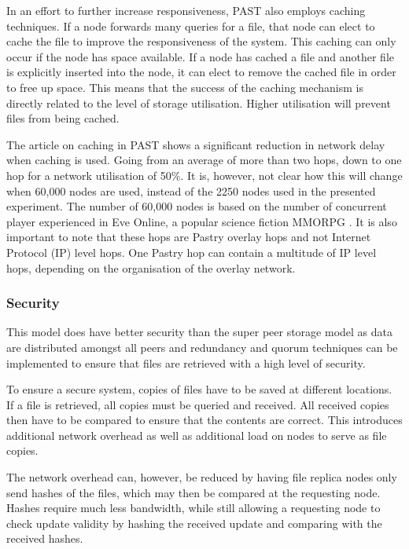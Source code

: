 \documentclass[10pt,a4paper,journal,cspaper,compsoc]{IEEEtran}
\begin{document}
In an effort to further increase responsiveness, PAST also employs caching techniques. If a node forwards many queries for a file, that node can
elect to cache the file to improve the responsiveness of the system. This caching can only occur if the node has space available. If a node has
cached a file and another file is explicitly inserted into the node, it can elect to remove the cached file in order to free up space. This means
that the success of the caching mechanism is directly related to the level of storage utilisation. Higher utilisation will prevent files from being
cached.

The article on caching in PAST shows a significant reduction in network delay when caching is used. Going from an average of more than two hops, down
to one hop for a network utilisation of 50\%. It is, however, not clear how this will change when 60,000 nodes are used, instead of the 2250 nodes
used in the presented experiment. The number of 60,000 nodes is based on the number of concurrent player experienced in Eve Online, a popular science
fiction MMORPG \cite{eve_pcu}. It is also important to note that these hops are Pastry overlay hops and not Internet Protocol (IP) level hops. One
Pastry hop can contain a multitude of IP level hops, depending on the organisation of the overlay network.


\subsubsection{Security}
This model does have better security than the super peer storage model as data are distributed amongst all peers and redundancy and quorum techniques
can be implemented to ensure that files are retrieved with a high level of security.

To ensure a secure system, copies of files have to be saved at different locations. If a file is retrieved, all copies must be queried and received.
All received copies then have to be compared to ensure that the contents are correct. This introduces additional network overhead as well as
additional load on nodes to serve as file copies.

The network overhead can, however, be reduced by having file replica nodes only send hashes of the files, which may then be compared at the
requesting node. Hashes require much less bandwidth, while still allowing a requesting node to check update validity by hashing the received update
and comparing with the received hashes.
\end{document}
